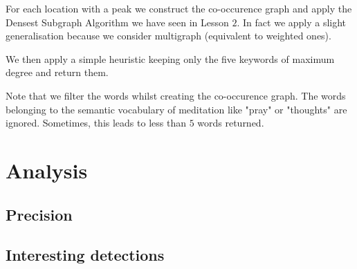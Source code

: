 \documentclass[a4paper]{article}
\begin{document}
For each location with a peak we construct the co-occurence graph and apply the Densest Subgraph Algorithm we have seen in Lesson $2$. In fact we apply a slight generalisation because we consider multigraph (equivalent to weighted ones).

We then apply a simple heuristic keeping only the five keywords of maximum degree and return them.

Note that we filter the words whilst creating the co-occurence graph. The words belonging to the semantic vocabulary of meditation like "pray" or "thoughts" are ignored. Sometimes, this leads to less than $5$ words returned.

\section{Analysis}
\subsection{Precision}
\subsection{Interesting detections}
\end{document}
